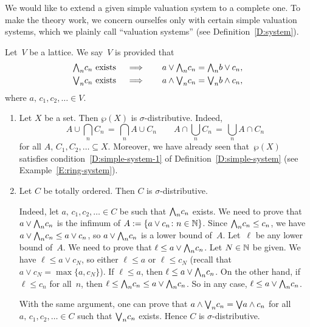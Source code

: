 \documentclass[main.tex]{subfiles}
\begin{document}
We would like to
extend a given simple valuation system to a complete one.
To make the theory work,
we concern ourselfes only with certain
simple valuation systems,
which we plainly call ``valuation systems'' (see Definition~\ref{D:system}).
%
% 
\begin{dfn}
Let~$V$ be a lattice.
We say~$V$ is
provided that
\begin{alignat*}{3}
\textstyle{\bigwedge}_n c_n\text{ exists} \quad&\implies\quad
&a \vee \textstyle{\bigwedge}_n c_n &= \textstyle{\bigwedge}_n b\vee c_n, \\
\textstyle{\bigvee}_n c_n\text{ exists} \quad&\implies\quad
&a \wedge \textstyle{\bigvee}_n c_n &= \textstyle{\bigvee}_n b\wedge c_n,
\end{alignat*}
where $a,\,c_1,c_2,\dotsc\in V$.
\end{dfn}
\begin{exs}
\begin{enumerate}
\item
Let $X$ be a set. Then $\wp(X)$ is $\sigma$-distributive.
Indeed,  
\begin{equation*}
\textstyle{
A \cup \bigcap_n C_n \,=\, \bigcap_n A \cup C_n
\qquad
A\cap \bigcup_n C_n \,=\, \bigcup_n A \cap C_n}
\end{equation*}
for all $A,\, C_1,C_2,\dotsc \subseteq X$.
Moreover,
we have already seen
that~$\wp(X)$ satisfies condition~\ref{D:simple-system-1}
of Definition~\ref{D:simple-system}
(see Example~\ref{E:ring-system}).
\item
Let $C$ be totally ordered. Then $C$ is $\sigma$-distributive.

Indeed,
let $a,\,c_1,c_2,\dotsc \in C$ be such that $\textstyle{\bigwedge}_n c_n$
exists. We need to prove that $a \vee \textstyle{\bigwedge}_n c_n$ is the 
infimum of $A := \{ a \vee c_n\colon n\in \mathbb{N} \}$.
Since $\textstyle{\bigwedge}_n c_n \leq c_n$,
we have $a \vee \textstyle{\bigwedge}_n c_n \leq a \vee c_n$,
so $a\vee\textstyle{\bigwedge}_n c_n$ is a lower bound of~$A$.
Let~$\ell$
be any lower bound of~$A$.
We need to prove that $\ell \leq a\vee \textstyle{\bigwedge}_n c_n$.
Let $N\in \mathbb{N}$ be given.
We have $\ell \leq a \vee c_N$,
so either $\ell \leq a$ or $\ell \leq c_N$
(recall that $a\vee c_N = \max\{a,c_N\}$).
If $\ell \leq a$, then $\ell \leq a \vee \textstyle{\bigwedge}_n c_n$.
On the other hand,
if $\ell \leq c_n$ for all~$n$,
then $\ell \leq \textstyle{\bigwedge}_n c_n \leq a \vee \textstyle{\bigwedge}_n c_n$.
So in any case,
$\ell \leq a \vee \textstyle{\bigwedge}_n c_n$.

With the same argument,
one can prove that $a \wedge \textstyle{\bigvee}_n c_n = \textstyle{\bigvee} a \wedge c_n$
for all $a,\,c_1,c_2,\dotsc \in C$
such that $\textstyle{\bigvee}_n c_n$ exists.
Hence $C$ is $\sigma$-distributive.


\end{enumerate}
\end{exs}
\end{document}
